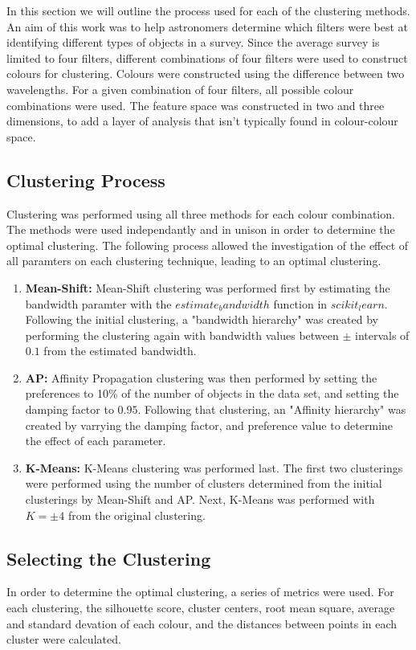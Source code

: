 In this section we will outline the process used for each of the clustering methods.
An aim of this work was to help astronomers determine which filters were best at identifying different types of objects in a survey. 
Since the average survey is limited to four filters, different combinations of four filters were used to construct colours for clustering. 
Colours were constructed using the difference between two wavelengths. For a given combination of four filters, all possible colour combinations were used. %
The feature space was constructed in two and three dimensions, to add a layer of analysis that isn't typically found in colour-colour space.

\subsection{Clustering Process}
Clustering was performed using all three methods for each colour combination. 
The methods were used independantly and in unison in order to determine the optimal clustering.
The following process allowed the investigation of the effect of all paramters on each clustering technique, leading to an optimal clustering. 
\begin{enumerate}
\item \textbf{Mean-Shift:} Mean-Shift clustering was performed first by estimating the bandwidth paramter with the $estimate_bandwidth$ function in $scikit_learn$.
Following the initial clustering, a "bandwidth hierarchy" was created by performing the clustering again with bandwidth values between $\pm$ intervals of $0.1$ from the estimated bandwidth.

\item \textbf{AP:} Affinity Propagation clustering was then performed by setting the preferences to 10\% of the number of objects in the data set, and setting the damping factor to $0.95$.
Following that clustering, an "Affinity hierarchy" was created by varrying the damping factor, and preference value to determine the effect of each parameter. 

\item \textbf{K-Means:} K-Means clustering was performed last.
The first two clusterings were performed using the number of clusters determined from the initial clusterings by Mean-Shift and AP.
Next, K-Means was performed with $K = \pm 4$ from the original clustering. 
\end{enumerate}
\subsection{Selecting the Clustering}
In order to determine the optimal clustering, a series of metrics were used.
For each clustering, the silhouette score, cluster centers, root mean square, average and standard devation of each colour, and the distances between points in each cluster were calculated. 
